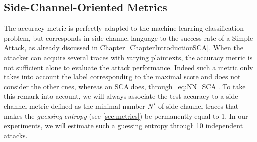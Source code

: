 \subsection{Side-Channel-Oriented Metrics} The accuracy metric is perfectly adapted to the machine learning classification problem, but corresponds in side-channel language to the success rate of a Simple Attack, as already discussed in Chapter~\ref{ChapterIntroductionSCA}. When the attacker can acquire several traces with varying plaintexts, the accuracy metric is not sufficient alone to evaluate the attack performance.
Indeed such a metric only takes into account the label corresponding to the maximal score and does not consider the other ones, whereas an SCA does, through~\eqref{eq:NN_SCA}. To take this remark into account, we will always associate the test accuracy to a side-channel metric defined as the minimal number  $N^\star$ of side-channel traces that makes the \emph{guessing entropy} (see \ref{sec:metrics}) be permanently equal to 1. In our experiments, we will estimate such a guessing entropy through 10 independent attacks. \\
%
%




